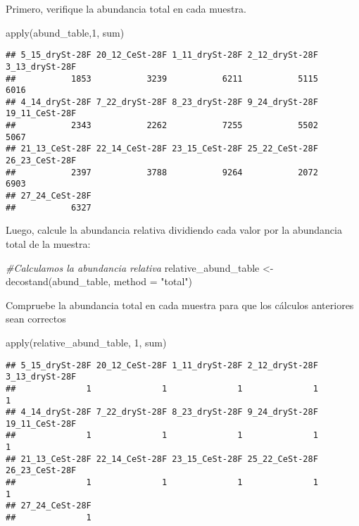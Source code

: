 \documentclass[
]{article}
\newenvironment{Shaded}{\begin{snugshade}}{\end{snugshade}}
\newcommand{\AttributeTok}[1]{\textcolor[rgb]{0.77,0.63,0.00}{#1}}
\newcommand{\CommentTok}[1]{\textcolor[rgb]{0.56,0.35,0.01}{\textit{#1}}}
\newcommand{\DecValTok}[1]{\textcolor[rgb]{0.00,0.00,0.81}{#1}}
\newcommand{\FunctionTok}[1]{\textcolor[rgb]{0.00,0.00,0.00}{#1}}
\newcommand{\NormalTok}[1]{#1}
\newcommand{\OtherTok}[1]{\textcolor[rgb]{0.56,0.35,0.01}{#1}}
\newcommand{\StringTok}[1]{\textcolor[rgb]{0.31,0.60,0.02}{#1}}
\begin{document}
Primero, verifique la abundancia total en cada muestra.

\begin{Shaded}
\begin{Highlighting}[]
\FunctionTok{apply}\NormalTok{(abund\_table,}\DecValTok{1}\NormalTok{, sum)}
\end{Highlighting}
\end{Shaded}

\begin{verbatim}
## 5_15_drySt-28F 20_12_CeSt-28F 1_11_drySt-28F 2_12_drySt-28F 3_13_drySt-28F 
##           1853           3239           6211           5115           6016 
## 4_14_drySt-28F 7_22_drySt-28F 8_23_drySt-28F 9_24_drySt-28F 19_11_CeSt-28F 
##           2343           2262           7255           5502           5067 
## 21_13_CeSt-28F 22_14_CeSt-28F 23_15_CeSt-28F 25_22_CeSt-28F 26_23_CeSt-28F 
##           2397           3788           9264           2072           6903 
## 27_24_CeSt-28F 
##           6327
\end{verbatim}

Luego, calcule la abundancia relativa dividiendo cada valor por la
abundancia total de la muestra:

\begin{Shaded}
\begin{Highlighting}[]
\CommentTok{\#Calculamos la abundancia relativa}
\NormalTok{relative\_abund\_table }\OtherTok{\textless{}{-}} \FunctionTok{decostand}\NormalTok{(abund\_table, }\AttributeTok{method =} \StringTok{"total"}\NormalTok{)}
\end{Highlighting}
\end{Shaded}

Compruebe la abundancia total en cada muestra para que los cálculos
anteriores sean correctos

\begin{Shaded}
\begin{Highlighting}[]
\FunctionTok{apply}\NormalTok{(relative\_abund\_table, }\DecValTok{1}\NormalTok{, sum)}
\end{Highlighting}
\end{Shaded}

\begin{verbatim}
## 5_15_drySt-28F 20_12_CeSt-28F 1_11_drySt-28F 2_12_drySt-28F 3_13_drySt-28F 
##              1              1              1              1              1 
## 4_14_drySt-28F 7_22_drySt-28F 8_23_drySt-28F 9_24_drySt-28F 19_11_CeSt-28F 
##              1              1              1              1              1 
## 21_13_CeSt-28F 22_14_CeSt-28F 23_15_CeSt-28F 25_22_CeSt-28F 26_23_CeSt-28F 
##              1              1              1              1              1 
## 27_24_CeSt-28F 
##              1
\end{verbatim}
\end{document}
